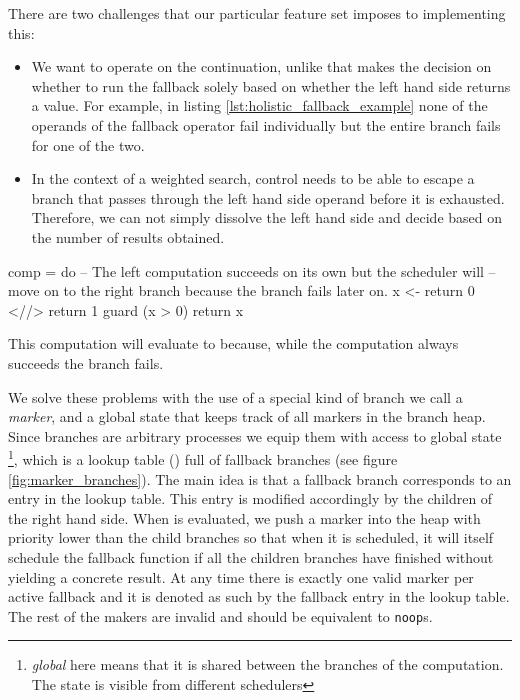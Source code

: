 There are two challenges that our particular feature set imposes to
implementing this:

\begin{itemize}
\item We want \hask{<//>} to operate on the continuation, unlike
  \cite{kiselyovBacktrackingInterleavingTerminating} that makes the
  decision on whether to run the fallback solely based on whether the
  left hand side returns a value. For example, in listing \ref{lst:holistic_fallback_example}
  none of the operands of the fallback operator fail individually
  but the entire branch fails for one of the two.
\item In the context of a weighted search, control needs to be able to
  escape a branch that passes through the left hand side operand
  before it is exhausted. Therefore, we can not simply dissolve the
  left hand side and decide based on the number of results obtained.
\end{itemize}

\begin{code}
\begin{haskellcode}
comp = do
  -- The left computation succeeds on its own  but the scheduler will
  -- move on to the right branch because the branch fails later on.
  x <- return 0 <//> return 1
  guard (x > 0)
  return x
\end{haskellcode}
\caption{\label{lst:holistic_fallback_example}This computation will evaluate to  because, while the computation  always succeeds the branch fails.}
\end{code}

We solve these problems with the use of a special kind of branch we
call a \emph{marker}, and a global state that keeps track of all
markers in the branch heap. Since branches are arbitrary processes we
equip them with access to global state \footnote{\emph{global} here means that it is shared between the branches of the computation. The state is visible from different schedulers},
which is a lookup table () full of fallback branches (see figure
\ref{fig:marker_branches}).  The main idea is that a fallback branch
corresponds to an entry in the lookup table. This entry is modified
accordingly by the children of the right hand side. When \hask{<//>} is evaluated,
we push a marker into the heap with priority lower than the child
branches so that when it is scheduled, it will itself schedule the
fallback function if all the children branches have finished without yielding a concrete
result. At any time there is exactly one valid marker per active
fallback and it is denoted as such by the fallback entry in the lookup
table. The rest of the makers are invalid and should be equivalent to
\texttt{noop}s.

